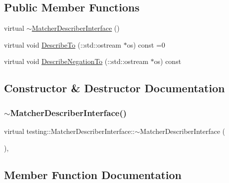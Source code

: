 \subsection*{Public Member Functions}
\begin{DoxyCompactItemize}
\item 
virtual \hyperlink{classtesting_1_1_matcher_describer_interface_ae2236a56ad2cc35cad10efc1208854f4}{$\sim$\+Matcher\+Describer\+Interface} ()
\item 
virtual void \hyperlink{classtesting_1_1_matcher_describer_interface_ad9f861588bd969b6e3e717f13bb94e7b}{Describe\+To} (\+::std\+::ostream $\ast$os) const =0
\item 
virtual void \hyperlink{classtesting_1_1_matcher_describer_interface_a2071afbc47097c4d1c0064275af34db0}{Describe\+Negation\+To} (\+::std\+::ostream $\ast$os) const
\end{DoxyCompactItemize}


\subsection{Constructor \& Destructor Documentation}
\mbox{\label{classtesting_1_1_matcher_describer_interface_ae2236a56ad2cc35cad10efc1208854f4}} 
\subsubsection{\texorpdfstring{$\sim$\+Matcher\+Describer\+Interface()}{~MatcherDescriberInterface()}}
{\footnotesize\ttfamily virtual testing\+::\+Matcher\+Describer\+Interface\+::$\sim$\+Matcher\+Describer\+Interface (\begin{DoxyParamCaption}{ }\end{DoxyParamCaption})\hspace{0.3cm}{\ttfamily [inline]}, {\ttfamily [virtual]}}



\subsection{Member Function Documentation}
\mbox{\label{classtesting_1_1_matcher_describer_interface_a2071afbc47097c4d1c0064275af34db0}} 
